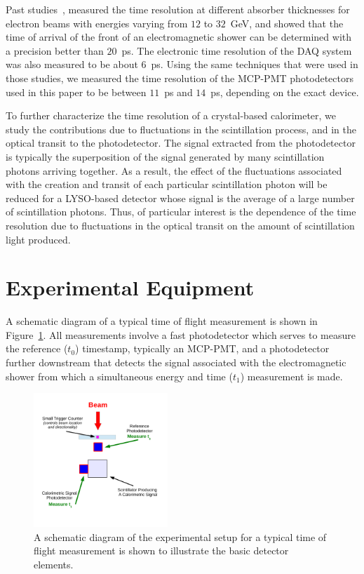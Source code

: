 \documentclass[12pt]{article}
\begin{document}
Past studies~\cite{MCPFastCaloNIMA}, measured the time resolution at different
absorber thicknesses for electron beams with energies varying from $12$ to
$32$~GeV, and showed that the time of arrival of the front of an electromagnetic
shower can be determined with a precision better than $20$~ps. The electronic
time resolution of the DAQ system was also measured to be about $6$~ps. Using
the same techniques that were used in those studies, we measured the time
resolution of the MCP-PMT photodetectors used in this paper to be between
$11$~ps and $14$~ps, depending on the exact device.

To further characterize the time resolution of a crystal-based calorimeter, we
study the contributions due to fluctuations in the scintillation process, and in
the optical transit to the photodetector. The signal extracted from the
photodetector is typically the superposition of the signal generated by many
scintillation photons arriving together. As a result, the effect of the
fluctuations associated with the creation and transit of each particular
scintillation photon will be reduced for a LYSO-based detector whose signal is
the average of a large number of scintillation photons. Thus, of particular
interest is the dependence of the time resolution due to fluctuations in the
optical transit on the amount of scintillation light produced.


\section{Experimental Equipment}

A schematic diagram of a typical time of flight measurement
is shown in Figure~\ref{fig:TypicalSchematicDiagram}. All
measurements involve a fast photodetector which serves to
measure the reference ($t_{0}$) timestamp, typically 
an MCP-PMT, and a photodetector further downstream
that detects the signal associated with the
electromagnetic shower from which a simultaneous energy 
and time ($t_{1}$) measurement is made. 

\begin{figure}[H] \centering
\includegraphics[width=0.45\textwidth]{figs/TypicalSchematicDiagram} 
\caption{A schematic diagram of the experimental setup for
a typical time of flight measurement is shown to illustrate the
basic detector elements.} 
\label{fig:TypicalSchematicDiagram}
\end{figure}
\end{document}
